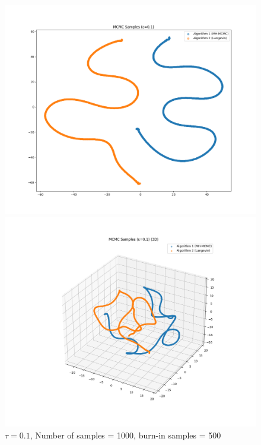 \documentclass[a4paper,12pt]{article}
\begin{document}
\begin{figure}[H]
  \centering
  \begin{minipage}{0.38\textwidth}
    \includegraphics[width=\linewidth]{TASK-0-1/images/samples_eps0.1_n1000_burn500_tsne_2d.png}
  \end{minipage}
  \hfill
  \begin{minipage}{0.38\textwidth}
    \includegraphics[width=\linewidth]{TASK-0-1/images/samples_eps0.1_n1000_burn500_tsne_3d.png}
  \end{minipage}
  \caption{$\tau = 0.1$, Number of samples = 1000, burn-in samples = 500}
\end{figure}
\end{document}

